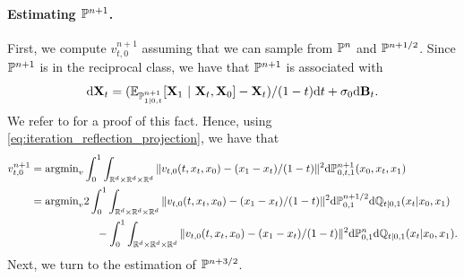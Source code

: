 \documentclass{article}
\begin{document}
\paragraph{Estimating $\mathbb{P}^{n+1}$.} First, we compute $v_{t,0}^{n+1}$ assuming that we can sample from $\mathbb{P}^n$ and $\mathbb{P}^{n+1/2}$. Since $\mathbb{P}^{n+1}$ is in the reciprocal class, we have that $\mathbb{P}^{n+1}$ is associated with 
\begin{equation}
    \mathrm{d} \mathbf{X}_t = (\mathbb{E}_{\mathbb{P}^{n+1}_{1|0,t}}[\mathbf{X}_1 \ | \ \mathbf{X}_t, \mathbf{X}_0] - \mathbf{X}_t) / (1 - t) \mathrm{d} t + \sigma_0 \mathrm{d} \mathbf{B}_t . 
\end{equation}
We refer to \cite{debortoli2023augmented} for a proof of this fact. Hence, using \eqref{eq:iteration_reflection_projection}, we have that 
\begin{align}
     v_{t,0}^{n+1} &=   \argmin_{v} \int_0^1 \int_{\rset^d \times \rset^d \times \rset^d} \| v_{t,0}(t, x_t, x_0) - (x_1 - x_t)/(1-t) \|^2 \rmd \Pbb^{n+1}_{0,t,1}(x_0, x_t, x_1) \\
    &=   \argmin_{v} 2 \int_0^1 \int_{\rset^d \times \rset^d \times \rset^d} \| v_{t,0}(t, x_t, x_0) - (x_1 - x_t)/(1-t) \|^2 \rmd \Pbb^{n+1/2}_{0,1} \rmd \Qbb_{t|0,1}(x_t|x_0,x_1) \\
    &\qquad \qquad \qquad    - \int_0^1 \int_{\rset^d \times \rset^d \times \rset^d} \| v_{t,0}(t, x_t, x_0) - (x_1 - x_t)/(1-t) \|^2 \rmd \Pbb^{n}_{0,1} \rmd \Qbb_{t|0,1}(x_t|x_0,x_1) . \label{eq:non_markov_dr}
\end{align}
Next, we turn to the estimation of $\mathbb{P}^{n+3/2}$.
\end{document}

